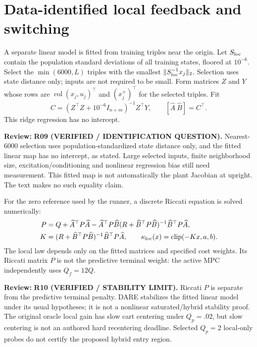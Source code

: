 \documentclass[11pt]{article}
\newcommand{\col}{\operatorname{col}}
\newcommand{\clip}{\operatorname{clip}}
\newcommand{\review}[1]{\par\noindent\textcolor{red!70!black}{\textbf{Review:} #1}\par}
\begin{document}
\section{Data-identified local feedback and switching}
A separate linear model is fitted from training triples near the origin. Let $S_{\rm loc}$ contain the population standard deviations of all training states, floored at $10^{-6}$. Select the $\min(6000,L)$ triples with the smallest $\|S_{\rm loc}^{-1}x_j\|_2$. Selection uses state distance only; inputs are not required to be small. Form matrices $Z$ and $Y$ whose rows are $\col(x_j,u_j)^\top$ and $(x_j^+)^\top$ for the selected triples. Fit
\begin{equation}\label{eq:ridge}
C=(Z^\top Z+10^{-6}I_{n+m})^{-1}Z^\top Y,\qquad [\widehat A\ \widehat B]=C^\top.
\end{equation}
This ridge regression has no intercept.
\review{\textbf{R09 (VERIFIED / IDENTIFICATION QUESTION).} Nearest-6000 selection uses population-standardized state distance only, and the fitted linear map has no intercept, as stated. Large selected inputs, finite neighborhood size, excitation/conditioning and nonlinear regression bias still need measurement. This fitted map is not automatically the plant Jacobian at upright. The text makes no such equality claim.}
 For the zero reference used by the runner, a discrete Riccati equation is solved numerically:
\begin{align}
P&=Q+\widehat A^\top P\widehat A-\widehat A^\top P\widehat B(R+\widehat B^\top P\widehat B)^{-1}\widehat B^\top P\widehat A,\label{eq:dare}\\
K&=(R+\widehat B^\top P\widehat B)^{-1}\widehat B^\top P\widehat A,\qquad
\kappa_{\rm loc}(x)=\clip(-Kx,a,b).\label{eq:local}
\end{align}
The local law depends only on the fitted matrices and specified cost weights. Its Riccati matrix $P$ is not the predictive terminal weight: the active MPC independently uses $Q_f=12Q$.
\review{\textbf{R10 (VERIFIED / STABILITY LIMIT).} Riccati $P$ is separate from the predictive terminal penalty. DARE stabilizes the fitted linear model under its usual hypotheses; it is not a nonlinear saturated/hybrid stability proof. The original oracle local gain has slow cart centering under $Q_p=.02$, but slow centering is not an authored hard recentering deadline. Selected $Q_p=2$ local-only probes do not certify the proposed hybrid entry region.}
\end{document}

